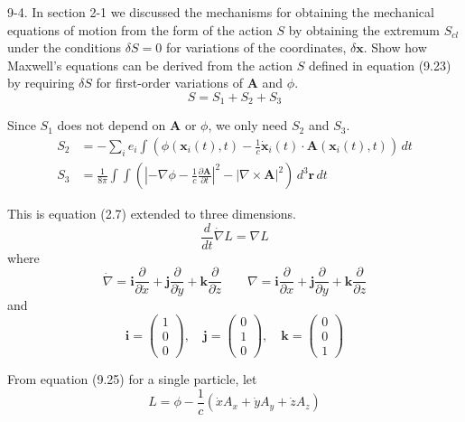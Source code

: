 \documentclass[12pt]{article}
\begin{document}
9-4.
In section 2-1 we discussed the mechanisms for obtaining
the mechanical equations of motion from the form of the action $S$ by
obtaining the extremum $S_{cl}$ under the conditions $\delta S=0$
for variations
of the coordinates, $\delta\mathbf x$. Show how Maxwell's equations can be
derived
from the action $S$ defined in equation (9.23) by requiring $\delta S$
for first-order variations of $\mathbf A$ and $\phi$.
\begin{equation*}
S=S_1+S_2+S_3
\tag{9.23}
\end{equation*}

Since $S_1$ does not depend on $\mathbf A$ or $\phi$,
we only need $S_2$ and $S_3$.
\begin{align*}
S_2&=-\sum_i e_i\int\left(
\phi(\mathbf x_i(t),t)
-\frac{1}{c}\dot{\mathbf x}_i(t)\cdot\mathbf A(\mathbf x_i(t),t)
\right)
\,dt
\tag{9.25}
\\
S_3&=\frac{1}{8\pi}\int\int
\left(
\left|-\nabla\phi-\frac{1}{c}\frac{\partial\mathbf A}{\partial t}\right|^2
-\left|\nabla\times\mathbf A\right|^2
\right)
\,d^3\mathbf r\,dt
\tag{9.26}
\end{align*}

This is equation (2.7) extended to three dimensions.
\begin{equation*}
\frac{d}{dt}\dot\nabla L=\nabla L
\tag{1}
\end{equation*}
where
\begin{equation*}
\dot\nabla
=\mathbf i\frac{\partial}{\partial\dot x}
+\mathbf j\frac{\partial}{\partial\dot y}
+\mathbf k\frac{\partial}{\partial\dot z}
\qquad
\nabla
=\mathbf i\frac{\partial}{\partial x}
+\mathbf j\frac{\partial}{\partial y}
+\mathbf k\frac{\partial}{\partial z}
\end{equation*}
and
\begin{equation*}
\mathbf i=\begin{pmatrix}1\\0\\0\end{pmatrix},
\quad
\mathbf j=\begin{pmatrix}0\\1\\0\end{pmatrix},
\quad
\mathbf k=\begin{pmatrix}0\\0\\1\end{pmatrix}
\end{equation*}

From equation (9.25) for a single particle, let
\begin{equation*}
L=\phi-\frac{1}{c}(\dot xA_x+\dot yA_y+\dot zA_z)
\end{equation*}
\end{document}
